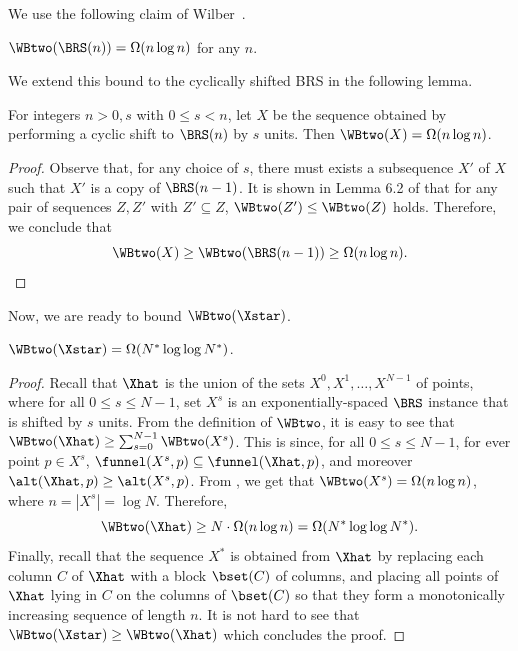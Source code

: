 \documentclass{toc}
\begin{document}
We use the following claim of Wilber~\cite{wilber}. %
%
\begin{claim}
$\WBtwo(\BRS(n))=\Omega(n\log n)$ for any $n$.
\end{claim}

We extend this bound to the cyclically shifted BRS in the following lemma.
\begin{lemma}
\label{lem:shifted BRS} For integers $n>0,s$ with  $0\leq s<n$, let $X$ be the sequence obtained by performing
a cyclic shift to $\BRS(n)$ by $s$ units. Then $\WBtwo(X)=\Omega(n\log n)$. 
\end{lemma}

\begin{proof}
Observe that, for any choice of $s$, there must exists
a subsequence $X'$ of $X$ such that $X'$ is a copy of $\BRS(n-1)$. It is shown in Lemma 6.2 of \cite{LevyT19}
that for any pair of sequences $Z,Z'$ with $Z'\subseteq Z$, $\WBtwo(Z')\le\WBtwo(Z)$ holds. Therefore, we conclude that
\[
\WBtwo(X)\ge\WBtwo(\BRS(n-1))\ge \Omega(n\log n).
\]
\end{proof}





Now, we are ready to bound  $\WBtwo(\Xstar)$.

\begin{lemma}
$\WBtwo(\Xstar)=\Omega(N^{*}\log\log N^{*})$.
\end{lemma}

\begin{proof}
Recall that $\Xhat$ is the union of the sets $X^{0},X^{1},\dots,X^{N-1}$ of points, where for all $0\leq s\leq N-1$, set $X^{s}$ is an exponentially-spaced $\BRS$ instance that is shifted
by $s$ units. From the definition
of $\WBtwo$, it is easy to see that $\WBtwo(\Xhat)\ge\sum_{s=0}^{N-1}\WBtwo(X^{s})$. This is since, for all $0\leq s\leq N-1$, for ever point $p\in X^{s}$, $\funnel(X^s,p)\subseteq \funnel(\Xhat, p)$, and moreover $\alt(\Xhat,p)\geq \alt(X^s,p)$.
From , we get that $\WBtwo(X^{s})=\Omega(n\log n)$, where $n=|X^s|=\log N$. Therefore,
\[
\WBtwo(\Xhat)\ge N\cdot\Omega(n\log n)=\Omega(N^{*}\log\log N^{*}).
\]
Finally, recall that the sequence $X^{*}$ is obtained from $\Xhat$
by replacing each column $C$ of $\Xhat$ with a block $\bset(C)$ of columns, and placing all points of $\Xhat$ lying in $C$ on the columns of $\bset(C)$ so that they form a monotonically increasing sequence of length $n$. It is not hard to see that $\WBtwo(\Xstar)\ge\WBtwo(\Xhat)$
which concludes the proof.
\end{proof}
\end{document}
